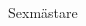 \documentclass[../_main/handlingar.tex]{subfiles}
\begin{document}

\begin{signatures}{1}
    \mvh
    \signature{Alexander Wik}{Sexmästare}
\end{signatures}
\end{document}
